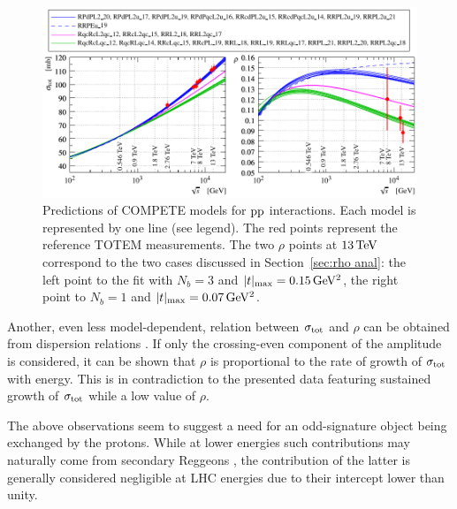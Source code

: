 \begin{figure}
\vskip-5mm
\begin{center}
\includegraphics{fig/compete_bands_si_tot_rho.pdf}
\caption{%
Predictions of COMPETE models \cite{compete-details} for $\rm pp$ interactions. Each model is represented by one line (see legend). The red points represent the reference TOTEM measurements. The two $\rho$ points at $13\,{\rm TeV}$ correspond to the two cases discussed in Section~\ref{sec:rho anal}: the left point to the fit with $N_b=3$ and $|t|_{\rm max} = 0.15\,{\rm GeV^2}$, the right point to $N_b=1$ and $|t|_{\rm max} = 0.07\,{\rm GeV^2}$.
}
\label{fig:comp bands}
\end{center}
\end{figure}

Another, even less model-dependent, relation between $\sigma_{\rm tot}$ and $\rho$ can be obtained from dispersion relations . If only the crossing-even component of the amplitude is considered, it can be shown that $\rho$ is proportional to the rate of growth of $\sigma_{\rm tot}$ with energy. This is in contradiction to the presented data featuring sustained growth of $\sigma_{\rm tot}$ while a low value of $\rho$.

The above observations seem to suggest a need for an odd-signature object being exchanged by the protons. While at lower energies such contributions may naturally come from secondary Reggeons , the contribution of the latter is generally considered negligible at LHC energies due to their intercept lower than unity.

